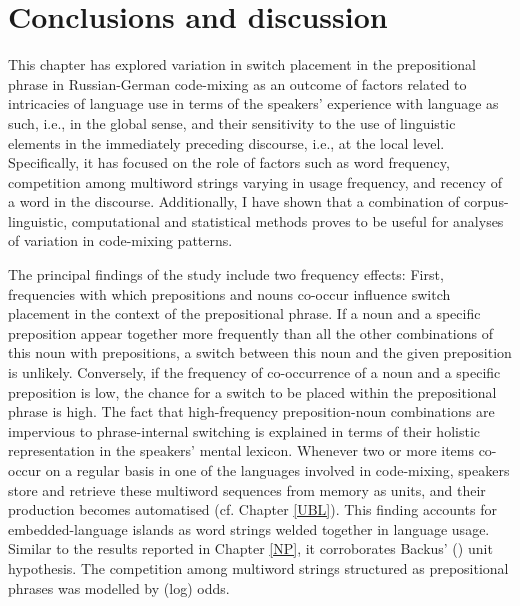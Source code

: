 \section{Conclusions and discussion}

This chapter has explored variation in switch placement in the prepositional phrase in Russian-German code-mixing as an outcome of factors related to intricacies of language use in terms of the speakers’ experience with language as such, i.e., in the global sense, and their sensitivity to the use of linguistic elements in the immediately preceding discourse, i.e., at the local level. Specifically, it has focused on the role of factors such as word frequency, competition among multiword strings varying in usage frequency, and recency of a word in the discourse. Additionally, I have shown that a combination of corpus-linguistic, computational and statistical methods proves to be useful for analyses of variation in code-mixing patterns.

The principal findings of the study include two frequency effects: First, frequencies with which prepositions and nouns co-occur influence switch placement in the context of the prepositional phrase. If a noun and a specific preposition appear together more frequently than all the other combinations of this noun with prepositions, a switch between this noun and the given preposition is unlikely. Conversely, if the frequency of co-occurrence of a noun and a specific preposition is low, the chance for a switch to be placed within the prepositional phrase is high. The fact that high-frequency preposition-noun combinations are impervious to phrase-internal switching is explained in terms of their holistic representation in the speakers' mental lexicon. Whenever two or more items co-occur on a regular basis in one of the languages involved in code-mixing, speakers store and retrieve these multiword sequences from memory as units, and their production becomes automatised (cf. Chapter \ref{UBL}). This finding accounts for embedded-language islands as word strings welded together in language usage. Similar to the results reported in Chapter \ref{NP}, it  corroborates Backus’ (\citeyear{backus-units-2003}) unit hypothesis. The competition among multiword strings structured as prepositional phrases was modelled by (log) odds. 

